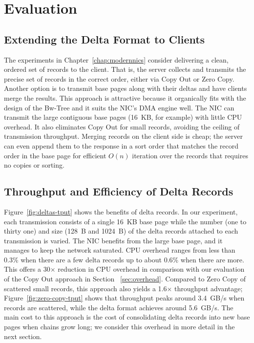 



\section{Evaluation}

\subsection{Extending the Delta Format to Clients}


The experiments in Chapter~\ref{chap:modernnics} consider delivering a clean, ordered set of records to the
client. That is, the server collects and transmits the precise set of records
in the correct order, either via Copy Out or Zero Copy. Another option is to
transmit base pages along with their deltas and have clients merge the results.
This approach is attractive because it organically fits with the design of the
Bw-Tree and it suits the NIC's DMA engine well.  The NIC can transmit the
large contiguous base pages (16~KB, for example) with little CPU overhead.
It also eliminates Copy Out for small records, avoiding the ceiling of transmission throughput. %
Merging records on the client side is cheap; the server can even append them to
the response in a sort order that matches the record order in the base page for
efficient $O(n)$ iteration over the records that requires no copies or sorting.


\subsection{Throughput and Efficiency of Delta Records}
\label{sec:delta-tput-efficiency}
Figure~\ref{fig:deltas-tput} shows the benefits of delta records. In our
experiment, each transmission consists of a single 16~KB base page while the
number (one to thirty one) and size (128~B and 1024~B) of the delta records attached to each transmission is varied.
The NIC benefits from the large base page, and it manages to keep the network
saturated. CPU overhead ranges from less than 0.3\% when there are a few delta
records up to about 0.6\% when there are more. This offers a 30$\times$ reduction 
in CPU overhead in comparison with our evaluation of the Copy Out approach in 
Section ~\ref{sec:overhead}. Compared to Zero Copy of scattered
small records, this approach also yields a 1.6$\times$ throughput advantage;
Figure~\ref{fig:zero-copy-tput} shows that throughput peaks around 3.4~GB/s when
records are scattered, while the delta format achieves around  5.6~GB/s. The main cost 
to this approach is the cost of consolidating delta records into new base pages 
when chains grow long; we consider this overhead in more detail in the next section.

